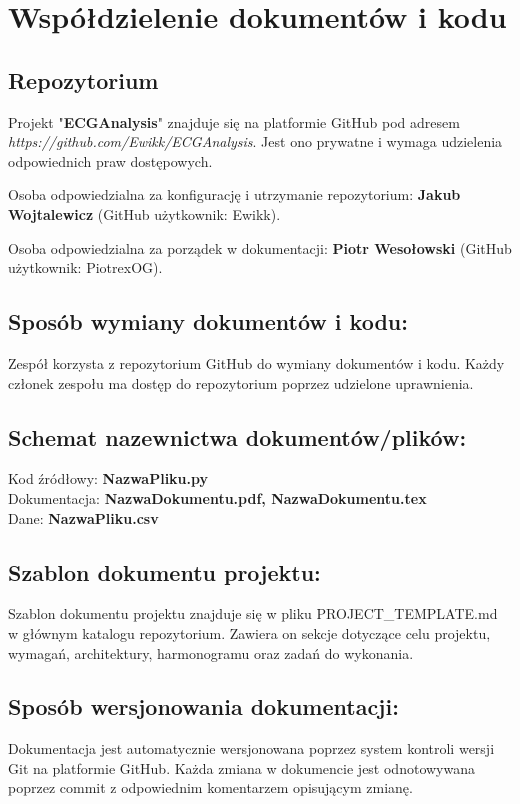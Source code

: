 \documentclass[12pt]{article}
\begin{document}
    \section{Współdzielenie dokumentów i kodu }
            
        \subsection*{Repozytorium}
            Projekt "\textbf{ECGAnalysis}" znajduje się na platformie GitHub pod adresem \textit{https://github.com/Ewikk/ECGAnalysis}. Jest ono prywatne i wymaga udzielenia odpowiednich praw dostępowych. 

            Osoba odpowiedzialna za konfigurację i utrzymanie repozytorium: \textbf{Jakub Wojtalewicz} (GitHub użytkownik: Ewikk). 

            Osoba odpowiedzialna za porządek w dokumentacji: \textbf{Piotr Wesołowski} (GitHub użytkownik: PiotrexOG). 


        \subsection*{Sposób wymiany dokumentów i kodu:} 
            Zespół korzysta z repozytorium GitHub do wymiany dokumentów i kodu. Każdy członek zespołu ma dostęp do repozytorium poprzez udzielone uprawnienia. 

        \subsection*{Schemat nazewnictwa dokumentów/plików:}
            Kod źródłowy: \textbf{NazwaPliku.py} \\
            Dokumentacja: \textbf{NazwaDokumentu.pdf, NazwaDokumentu.tex}\\
            Dane: \textbf{NazwaPliku.csv}

        \subsection*{Szablon dokumentu projektu:}
            Szablon dokumentu projektu znajduje się w pliku PROJECT\_TEMPLATE.md w głównym katalogu repozytorium. Zawiera on sekcje dotyczące celu projektu, wymagań, architektury, harmonogramu oraz zadań do wykonania. 

        \subsection*{Sposób wersjonowania dokumentacji:} 
            Dokumentacja jest automatycznie wersjonowana poprzez system kontroli wersji Git na platformie GitHub. Każda zmiana w dokumencie jest odnotowywana poprzez commit z odpowiednim komentarzem opisującym zmianę. 
\end{document}
